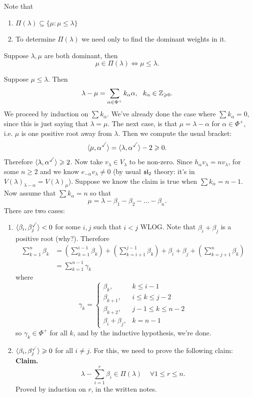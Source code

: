 \documentclass{article}
\begin{document}
Note that \begin{enumerate}
    \item $\Pi(\lambda) \subseteq \{ \mu : \mu \leq \lambda \}$
    \item To determine $\Pi(\lambda)$ we need only to find the dominant weights in it.
\end{enumerate}
\begin{fancyprop}{}
    Suppose $\lambda, \mu$ are both dominant, then \[ \mu \in \Pi(\lambda) \Leftrightarrow \mu \leq \lambda.\]
\end{fancyprop}
\proof Suppose $\mu \leq \lambda$. Then \[ \lambda - \mu = \sum_{\alpha \in \Phi^{+}} k_{\alpha} \alpha, \,\,\,\, k_{\alpha} \in \mathbb{Z}_{\geqslant 0}.\]
We proceed by induction on $\sum k_{\alpha}$. We've already done the case where $\sum k_{\alpha} = 0$, since this is just saying that $\lambda = \mu$. \gap 
The next case, is that $\mu = \lambda - \alpha$ for $\alpha \in \Phi^{+}$, i.e. $\mu$ is one positive root away from $\lambda$. Then we compute the usual bracket: \[ \langle \mu, \alpha^{\checked} \rangle = \langle \lambda, \alpha^{\checked} \rangle - 2 \geq 0.\] Therefore $\langle \lambda, \alpha^{\checked} \rangle \geq 2$. Now take $v_{\lambda} \in V_{\lambda}$ to be non-zero. Since $h_{\alpha}v_{\lambda} = nv_{\lambda}$, for some $n \geq 2$ and we know $e_{-\alpha}v_{\lambda} \neq 0$ (by usual $\mathfrak{sl}_{2}$ theory: it's in $V(\lambda)_{\lambda - \alpha} = V(\lambda)_{\mu}$). \gap 
Suppose we know the claim is true when $\sum k_{\alpha} = n-1$. Now assume that $\sum k_{\alpha} = n$ so that \[\mu = \lambda - \beta_{1} - \beta_{2} - \dots - \beta_{n}.\] There are two cases:
\begin{enumerate}
    \item[Case 1.] $\langle \beta_{i}, \beta_{j}^{\checked} \rangle < 0$ for some $i,j$ such that $i < j$ WLOG. Note that $\beta_{i} + \beta_{j}$ is a positive root (why?). \gap 
    Therefore
    \begin{align*}
        \sum_{k=1}^{n} \beta_{k} &= \left( \sum_{k=1}^{i-1}\beta_{k} \right) + \left( \sum_{k=i+1}^{j-1} \beta_{k} \right) + \beta_{i} + \beta_{j} + \left( \sum_{k=j+1}^{n} \beta_{k} \right)\\
        &= \sum_{k=1}^{n-1} \gamma_{k}
    \end{align*}
    where \[ \gamma_{k} = \begin{cases}
        \beta_{k}, & k\leq i-1\\
        \beta_{k+1}, & i \leq k \leq j-2\\
        \beta_{k+2}, & j-1 \leq k \leq n-2\\
        \beta_{i} + \beta_{j}, & k=n-1
    \end{cases} \]
    so $\gamma_{k} \in \Phi^{+}$ for all $k$, and by the inductive hypothesis, we're done.
    \item[Case 2.] $\langle \beta_{i}, \beta_{j}^{\checked} \rangle \geq 0$ for all $i\neq j$. For this, we need to prove the following claim: \gap 
    \textbf{Claim.} \[\lambda - \sum_{i=1}^{r} \beta_{i} \in \Pi(\lambda) \,\,\,\,\,\,\, \forall 1 \leq r \leq n.\]
    Proved by induction on $r$, in the written notes.
\end{enumerate}
\end{document}
